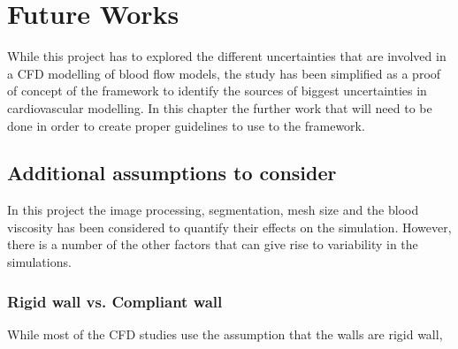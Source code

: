 \chapter{Future Works}
\label{chapterlabel9}

While this project has to explored the different uncertainties that are involved in a CFD modelling of blood flow models, the study has been simplified as a proof of concept of the framework to identify the sources of biggest uncertainties in cardiovascular modelling. In this chapter the further work that will need to be done in order to create proper guidelines to use to the framework.

\section{Additional assumptions to consider}
In this project the image processing, segmentation, mesh size and the blood viscosity has been considered to quantify their effects on the simulation. However, there is a number of the other factors that can give rise to variability in the simulations.

\subsection{Rigid wall vs. Compliant wall}
While most of the CFD studies use the assumption that the walls are rigid wall, 